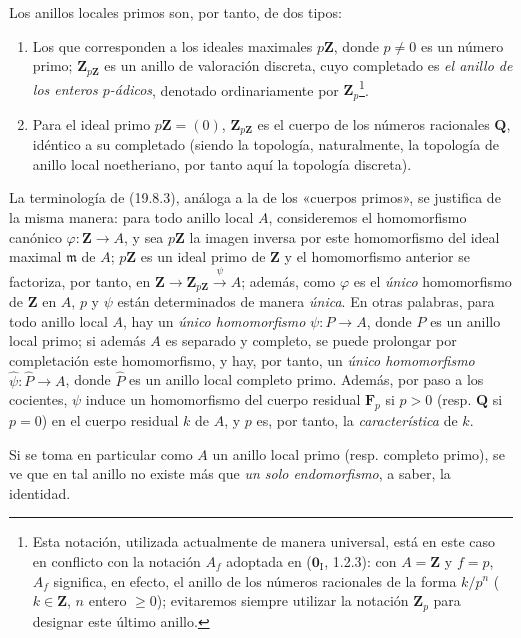 Los anillos locales primos son, por tanto, de dos tipos:
\begin{enumerate}
  \item[$1^{\mathrm o}$] Los que corresponden a los ideales maximales
  $p\mathbf Z$, donde $p\neq0$ es un número primo; $\mathbf Z_{p\mathbf Z}$
  es un anillo de valoración discreta, cuyo completado es \emph{el anillo de los
  enteros $p$-ádicos}, denotado ordinariamente por $\mathbf Z_p$\footnote{Esta notación,
  utilizada actualmente de manera universal, está en este caso en conflicto con la
  notación $A_f$ adoptada en ($\mathbf 0_{\mathrm I}$, 1.2.3): con
  $A=\mathbf Z$ y $f=p$, $A_f$ significa, en efecto, el anillo de los números
  racionales de la forma $k/p^n$ ($k\in\mathbf Z$, $n$ entero $\geq0$);
  evitaremos siempre utilizar la notación $\mathbf Z_p$ para designar este
  último anillo.}.
  \item[$2^{\mathrm o}$] Para el ideal primo $p\mathbf Z=(0)$,
  $\mathbf Z_{p\mathbf Z}$ es el cuerpo de los números racionales $\mathbf Q$,
  idéntico a su completado (siendo la topología, naturalmente, la topología
  de anillo local noetheriano, por tanto aquí la topología discreta).
\end{enumerate}

La terminología de (19.8.3), análoga a la de los «cuerpos primos», se
justifica de la misma manera: para todo anillo local $A$, consideremos
el homomorfismo canónico $\varphi:\mathbf Z\to A$, y sea $p\mathbf Z$
la imagen inversa por este homomorfismo del ideal maximal $\mathfrak m$ de
$A$; $p\mathbf Z$ es un ideal primo de $\mathbf Z$ y el homomorfismo
anterior se factoriza, por tanto, en
$\mathbf Z\to\mathbf Z_{p\mathbf Z}\xrightarrow{\psi}A$; además, como
$\varphi$ es el \emph{único} homomorfismo de $\mathbf Z$ en $A$, $p$ y
$\psi$ están determinados de manera \emph{única}. En otras palabras, para todo anillo
local $A$, hay un \emph{único homomorfismo} $\psi:P\to A$, donde $P$ es un
anillo local primo; si además $A$ es separado y completo, se puede prolongar
por completación este homomorfismo, y hay, por tanto, un \emph{único
homomorfismo} $\widehat\psi:\widehat P\to A$, donde $\widehat P$ es un anillo
local completo primo. Además, por paso a los cocientes, $\psi$ induce un
homomorfismo del cuerpo residual $\mathbf F_p$ si $p>0$ (resp. $\mathbf Q$ si
$p=0$) en el cuerpo residual $k$ de $A$, y $p$ es, por tanto, la
\emph{característica} de $k$.

Si se toma en particular como $A$ un anillo local primo (resp. completo
primo), se ve que en tal anillo no existe más que \emph{un solo
endomorfismo}, a saber, la identidad.
